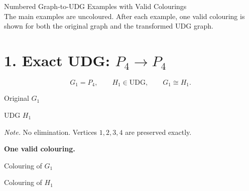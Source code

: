 \documentclass[11pt]{article}
\newcommand{\UDG}{\mathrm{UDG}}
\begin{document}
\begin{center}
{\LARGE Numbered Graph-to-UDG Examples with Valid Colourings}\\[4pt]
{\small The main examples are uncoloured. After each example, one valid colouring is shown for both the original graph and the transformed UDG graph.}
\end{center}

\section*{1. Exact UDG: $P_4 \to P_4$}
\[
G_1=P_4,\qquad H_1\in\UDG,\qquad G_1\cong H_1.
\]
\begin{center}
\begin{minipage}{0.47\textwidth}\centering
Original $G_1$
\end{minipage}
\begin{minipage}{0.47\textwidth}\centering
UDG $H_1$
\end{minipage}
\end{center}
\textit{Note.} No elimination. Vertices $1,2,3,4$ are preserved exactly.

\textbf{One valid colouring.}
\begin{center}
\begin{minipage}{0.47\textwidth}\centering
Colouring of $G_1$
\end{minipage}
\begin{minipage}{0.47\textwidth}\centering
Colouring of $H_1$
\end{minipage}
\end{center}
\end{document}
